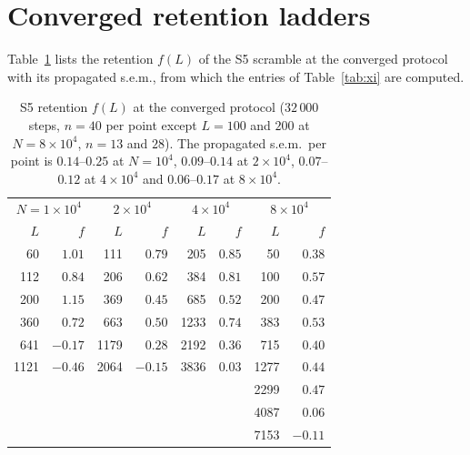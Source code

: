 \documentclass[reprint,amsmath,amssymb,aps,pre,longbibliography]{revtex4-2}
\begin{document}
\appendix

\section{Converged retention ladders}\label{app:ladders}

Table~\ref{tab:ladders} lists the retention $f(L)$ of the S5 scramble at the converged
protocol with its propagated s.e.m., from which the entries of Table~\ref{tab:xi} are
computed.

\begin{table}[h]
\caption{S5 retention $f(L)$ at the converged protocol ($32\,000$ steps, $n=40$ per point
except $L=100$ and $200$ at $N=8\times10^{4}$, $n=13$ and $28$). The propagated s.e.m.\ per
point is $0.14$--$0.25$ at $N=10^{4}$, $0.09$--$0.14$ at $2\times10^{4}$, $0.07$--$0.12$ at
$4\times10^{4}$ and $0.06$--$0.17$ at $8\times10^{4}$.}
\label{tab:ladders}
\footnotesize
\setlength{\tabcolsep}{3.5pt}
\begin{ruledtabular}
\begin{tabular}{rrrrrrrr}
\multicolumn{2}{c}{$N=1\times10^{4}$} & \multicolumn{2}{c}{$2\times10^{4}$} &
\multicolumn{2}{c}{$4\times10^{4}$} & \multicolumn{2}{c}{$8\times10^{4}$}\\
$L$ & $f$ & $L$ & $f$ & $L$ & $f$ & $L$ & $f$\\ \hline
  60 & $1.01$  & 111  & $0.79$  & 205  & $0.85$ & 50   & $0.38$\\
 112 & $0.84$  & 206  & $0.62$  & 384  & $0.81$ & 100  & $0.57$\\
 200 & $1.15$  & 369  & $0.45$  & 685  & $0.52$ & 200  & $0.47$\\
 360 & $0.72$  & 663  & $0.50$  & 1233 & $0.74$ & 383  & $0.53$\\
 641 & $-0.17$ & 1179 & $0.28$  & 2192 & $0.36$ & 715  & $0.40$\\
1121 & $-0.46$ & 2064 & $-0.15$ & 3836 & $0.03$ & 1277 & $0.44$\\
     &         &      &         &      &        & 2299 & $0.47$\\
     &         &      &         &      &        & 4087 & $0.06$\\
     &         &      &         &      &        & 7153 & $-0.11$\\
\end{tabular}
\end{ruledtabular}
\end{table}
\end{document}
